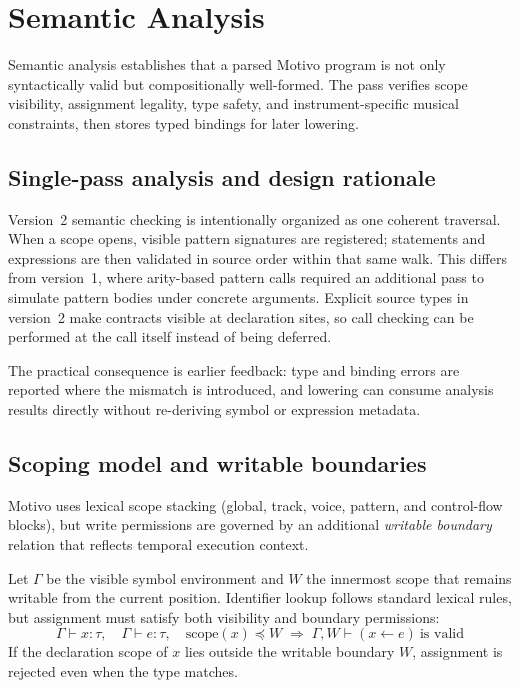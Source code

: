 \section{Semantic Analysis}\label{sec:semantic-rules}

Semantic analysis establishes that a parsed Motivo program is not only syntactically valid but compositionally
well-formed.
The pass verifies scope visibility, assignment legality, type safety, and instrument-specific musical constraints, then
stores typed bindings for later lowering.

\subsection{Single-pass analysis and design rationale}

Version~2 semantic checking is intentionally organized as one coherent traversal.
When a scope opens, visible pattern signatures are registered; statements and expressions are then validated in source
order within that same walk.
This differs from version~1, where arity-based pattern calls required an additional pass to simulate pattern bodies
under concrete arguments.
Explicit source types in version~2 make contracts visible at declaration sites, so call checking can be performed at the
call itself instead of being deferred.

The practical consequence is earlier feedback:
type and binding errors are reported where the mismatch is introduced, and lowering can consume analysis
results directly
without re-deriving symbol or expression metadata.

\subsection{Scoping model and writable boundaries}

Motivo uses lexical scope stacking (global, track, voice, pattern, and control-flow blocks), but write permissions are
governed by an additional \emph{writable boundary} relation that reflects temporal execution context.

Let $\Gamma$ be the visible symbol environment and $W$ the innermost scope that remains writable from the current
position.
Identifier lookup follows standard lexical rules, but assignment must satisfy both visibility and boundary permissions:
\[
  \Gamma \vdash x : \tau,\quad
  \Gamma \vdash e : \tau,\quad
  \mathrm{scope}(x) \preceq W
  \;\Rightarrow\;
  \Gamma, W \vdash (x \leftarrow e)\ \text{is valid}
\]
If the declaration scope of $x$ lies outside the writable boundary $W$, assignment is rejected even when the type
matches.

